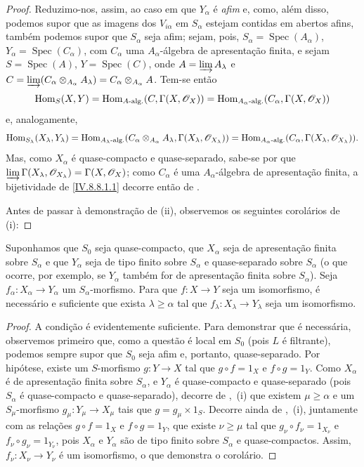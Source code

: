 \begin{proof}
Reduzimo-nos, assim, ao caso em que $Y_\alpha$ é \emph{afim} e, como, além disso, podemos supor que as imagens dos $V_{i\alpha}$ em $S_\alpha$ estejam contidas em abertos afins, também podemos supor que $S_\alpha$ seja afim; sejam, pois, $S_\alpha=\operatorname{Spec}(A_\alpha)$, $Y_\alpha=\operatorname{Spec}(C_\alpha)$, com $C_\alpha$ uma $A_\alpha$-álgebra de apresentação finita, e sejam $S=\operatorname{Spec}(A)$, $Y=\operatorname{Spec}(C)$, onde $A=\varinjlim A_\lambda$ e $C=\varinjlim(C_\alpha\otimes_{A_\alpha}A_\lambda)=C_\alpha\otimes_{A_\alpha}A$.
Tem-se então
\[
  \operatorname{Hom}_S(X,Y)=\operatorname{Hom}_{A\text{-alg.}}(C,\Gamma(X,\mathscr{O}_X))=\operatorname{Hom}_{A_\alpha\text{-alg.}}(C_\alpha,\Gamma(X,\mathscr{O}_X))
\]
 e, analogamente,
\[
  \operatorname{Hom}_{S_\lambda}(X_\lambda,Y_\lambda)=\operatorname{Hom}_{A_\lambda\text{-alg.}}(C_\alpha\otimes_{A_\alpha}A_\lambda,\Gamma(X_\lambda,\mathscr{O}_{X_\lambda}))=\operatorname{Hom}_{A_\alpha\text{-alg.}}(C_\alpha,\Gamma(X_\lambda,\mathscr{O}_{X_\lambda})).
\]
Mas, como $X_\alpha$ é quase-compacto e quase-separado, sabe-se por  que $\varinjlim\Gamma(X_\lambda,\mathscr{O}_{X_\lambda})=\Gamma(X,\mathscr{O}_X)$; como $C_\alpha$ é uma $A_\alpha$-álgebra de apresentação finita, a bijetividade de \eqref{IV.8.8.1.1} decorre então de .

Antes de passar à demonstração de (ii), observemos os seguintes corolários de (i):
\end{proof}

\begin{corollary}[8.8.2.4]
\label{IV.8.8.2.4}
Suponhamos que $S_0$ seja quase-compacto, que $X_\alpha$ seja de apresentação finita sobre $S_\alpha$ e que $Y_\alpha$ seja de tipo finito sobre $S_\alpha$ e quase-separado sobre $S_\alpha$ (o que ocorre, por exemplo, se $Y_\alpha$ também for
de apresentação finita sobre $S_\alpha$).
Seja $f_\alpha:X_\alpha\to Y_\alpha$ um $S_\alpha$-morfismo.
Para que $f:X\to Y$ seja um isomorfismo, é necessário e suficiente que exista $\lambda\geqslant\alpha$ tal que $f_\lambda:X_\lambda\to Y_\lambda$ seja um isomorfismo.
\end{corollary}

\begin{proof}
A condição é evidentemente suficiente. Para demonstrar que é necessária, observemos primeiro que, como a questão é local em $S_0$ (pois $L$ é filtrante), podemos sempre supor que $S_0$ seja afim e, portanto, quase-separado. Por hipótese, existe um $S$-morfismo $g:Y\to X$ tal que $g\circ f=1_X$ e $f\circ g=1_Y$. Como $X_\alpha$ é de apresentação finita sobre $S_\alpha$, e $Y_\alpha$ é quase-compacto e quase-separado (pois $S_\alpha$ é quase-compacto e quase-separado), decorre de ,~(i) que existem $\mu\geqslant\alpha$ e um $S_\mu$-morfismo $g_\mu:Y_\mu\to X_\mu$ tais que $g=g_\mu\times 1_S$. Decorre ainda de ,~(i), juntamente com as relações $g\circ f=1_X$ e $f\circ g=1_Y$, que existe $\nu\geqslant\mu$ tal que $g_\nu\circ f_\nu=1_{X_\nu}$ e $f_\nu\circ g_\nu=1_{Y_\nu}$, pois $X_\alpha$ e $Y_\alpha$ são de tipo finito sobre $S_\alpha$ e quase-compactos. Assim, $f_\nu:X_\nu\to Y_\nu$ é um isomorfismo, o que demonstra o corolário.
\end{proof}

